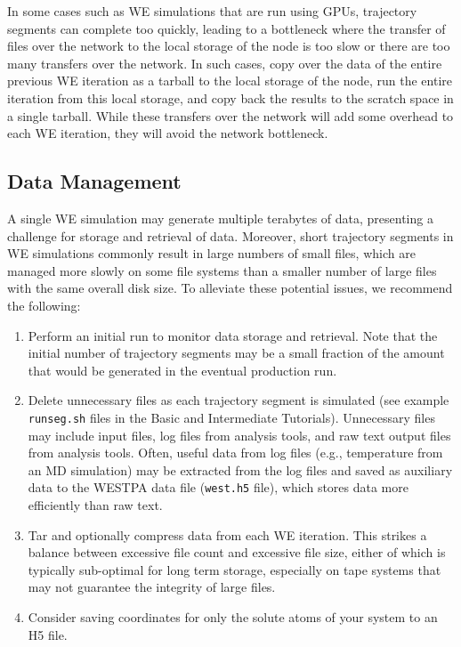 \documentclass[9pt,tutorial,ASAPversion]{livecoms}
\begin{document}
In some cases such as WE simulations that are run using GPUs, trajectory segments can complete too quickly, leading to a bottleneck where the transfer of files over the network to the local storage of the node is too slow or there are too many transfers over the network. 
In such cases, copy over the data of the entire previous WE iteration as a tarball  to the local storage of the node, run the entire iteration from this local storage, and copy back the results to the scratch space in a single tarball. 
While these transfers over the network will add some overhead to each WE iteration, they will avoid the network bottleneck. 

\subsection{Data Management}

A single WE simulation may generate multiple terabytes of data, presenting a challenge for storage and retrieval of data. 
Moreover, short trajectory segments in WE simulations commonly result in large numbers of small files, which are managed more slowly on some file systems than a smaller number of large files with the same overall disk size. 
To alleviate these potential issues, we recommend the following:

\begin{enumerate}
\item Perform an initial run to monitor data storage and retrieval. 
Note that the initial number of trajectory segments may be a small fraction of the amount that would be generated in the eventual production run. 
\item Delete unnecessary files as each trajectory segment is simulated (see example \verb|runseg.sh| files in the Basic and Intermediate Tutorials). 
Unnecessary files may include input files, log files from analysis tools, and raw text output files from analysis tools. 
Often, useful data from log files (e.g., temperature from an MD simulation) may be extracted from the log files and saved as auxiliary data to the WESTPA data file (\verb|west.h5| file), which stores data more efficiently than raw text.
\item Tar and optionally compress data from each WE iteration. 
This strikes a balance between excessive file count and excessive file size, either of which is typically sub-optimal for long term storage, especially on tape systems that may not guarantee the integrity of large files.
\item Consider saving coordinates for only the solute atoms of your system to an H5 file.
\end{enumerate}
\end{document}

